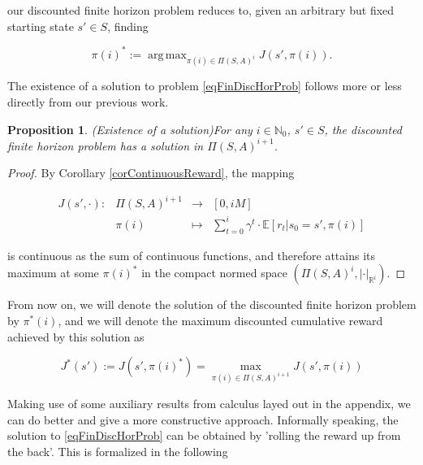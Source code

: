 \documentclass[11pt]{article} %
\newtheorem{prop}{Proposition}
\DeclareMathOperator*{\argmax}{arg\,max}
\begin{document}
our discounted finite horizon problem reduces to, given an arbitrary but fixed starting state $s' \in S$, finding

\begin{equation}\label{eqFinDiscHorProb}
	\pi(i)^* := \argmax_{\pi(i) \in \Pi(S,A)^i} J(s',\pi(i)).
\end{equation}

The existence of a solution to problem \ref{eqFinDiscHorProb} follows more or less directly from our previous work.

\begin{prop}(Existence of a solution)\label{propExistenceFiniteSolution}
	For any $i \in \mathbb{N}_0$, $s' \in S$, the discounted finite horizon problem has a solution in $\Pi(S,A)^{i+1}$.
\end{prop}

\begin{proof}
By Corollary \ref{corContinuousReward}, the mapping 

\begin{equation}\label{contDiscExpRewSumMap}
	\begin{array}{rccl}
		J(s',\cdot): 	& \Pi(S,A)^{i+1} 	& \rightarrow 	& [0,i M] \\
					& \pi(i)		& \mapsto 	& \sum\limits_{t=0}^i \gamma^t \cdot \mathbb{E}[ r_t | s_0 = s', \pi(i)]
	\end{array}
\end{equation}

is continuous as the sum of continuous functions, and therefore attains its maximum at some $\pi(i)^*$ in the compact normed space $(\Pi(S,A)^i,|\cdot|_{\mathbb{R}^i})$.
\end{proof}

From now on, we will denote the solution of the discounted finite horizon problem by $\pi^*(i)$, and we will denote the maximum discounted cumulative reward achieved by this solution as 

\begin{equation}
	J^*(s') := J(s',\pi(i)^*) = \max\limits_{\pi(i) \in \Pi(S,A)^{i+1}} J(s',\pi(i))
\end{equation}

Making use of some auxiliary results from calculus layed out in the appendix, we can do better and give a more constructive approach. Informally speaking, the solution to \ref{eqFinDiscHorProb} can be obtained by 'rolling the reward up from the back'. This is formalized in the following
\end{document}
